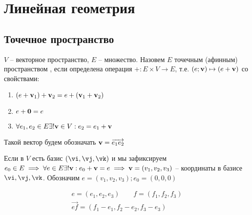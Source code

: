 \documentclass[main]{subfiles}
\begin{document}
\part{Линейная геометрия}
\chapter{Точечное пространство}
\begin{definition}
    $V$ -- векторное пространство, $E$ -- множество. Назовем $E$ точечным (афинным)
    пространством , если определена операция $+: E\times V \to E$, т.е. $(e; \mathbf{v}) \mapsto (e+\mathbf{v})$
    со свойствами:
    \begin{enumerate}
        \item $(e+\mathbf{v}_1) + \mathbf{v}_2 = e + (\mathbf{v}_1 + \mathbf{v}_2)$
        \item $e + \mathbf{0} = e$
        \item $\forall e_1, e_2 \in E \exists! \mathbf{v} \in V: e_2 = e_1 + \mathbf{v}$
    \end{enumerate}
    Такой вектор будем обозначать $\mathbf{v} = \overrightarrow{e_1 e_2}$

    Если в $V$ есть базис $(\vi, \vj, \vk)$ и мы зафиксируем
    $e_0 \in E \implies \forall e \in E \exists! \mathbf{v}:e_0 + \mathbf{v} = e
        \implies \mathbf{v} = (v_1, v_2, v_3)$ -- координаты в базисе $\vi, \vj, \vk$.
    Обозначим $e = (v_1, v_2, v_3); e_0 = (0,0,0)$
\end{definition}

\begin{remark}
    \begin{gather*}
        e = (e_1, e_2, e_3) \qquad f = (f_1, f_2, f_3)\\
        \overrightarrow{ef} = (f_1 - e_1, f_2 - e_2, f_3 - e_3)
    \end{gather*}
\end{remark}
\end{document}
